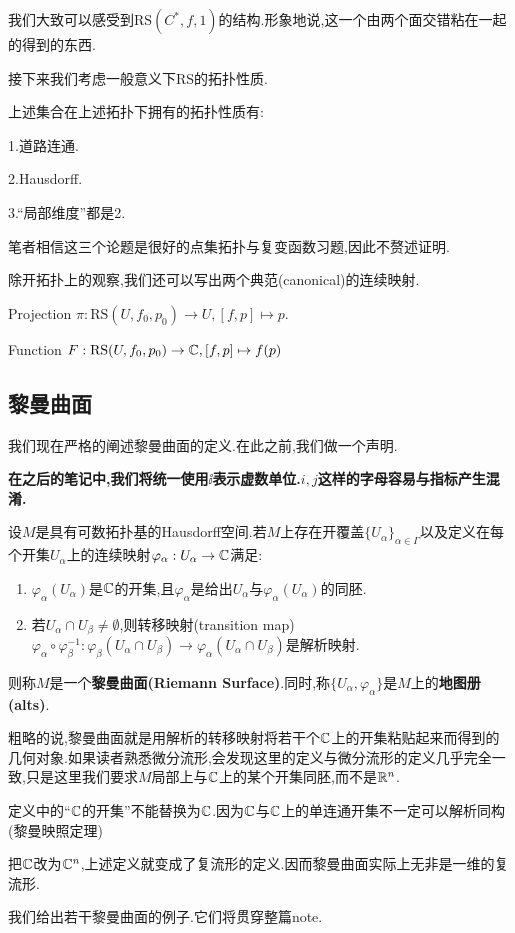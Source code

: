我们大致可以感受到$\text{RS}(C^*,f,1)$的结构.形象地说,这一个由两个面交错粘在一起的得到的东西.

接下来我们考虑一般意义下RS的拓扑性质.
\begin{proposition}
	上述集合在上述拓扑下拥有的拓扑性质有:
	
	1.道路连通.

	2.Hausdorff.

	3.“局部维度”都是2.
\end{proposition}
笔者相信这三个论题是很好的点集拓扑与复变函数习题,因此不赘述证明.

\begin{remark}
	除开拓扑上的观察,我们还可以写出两个典范(canonical)的连续映射.

	Projection \quad $\pi:\text{RS}(U,f_0,p_0) \to U,[f,p]\mapsto p$.

	Function \quad $F:\text{RS}(U,f_0,p_0) \to \mathbb{C},[f,p]\mapsto f(p)$
\end{remark}
\subsection{黎曼曲面}
我们现在严格的阐述黎曼曲面的定义.在此之前,我们做一个声明.

\textbf{在之后的笔记中,我们将统一使用$\ii$表示虚数单位.$i,j$这样的字母容易与指标产生混淆.}
\begin{definition}[黎曼曲面]
	设$M$是具有可数拓扑基的Hausdorff空间.若$M$上存在开覆盖$\{U_\alpha\}_{\alpha \in \Gamma}$以及定义在每个开集$U_\alpha$上的连续映射$\varphi_\alpha:U_\alpha \to \mathbb{C}$满足:
	\begin{enumerate}
		\item $\varphi_\alpha(U_\alpha)$是$\mathbb{C}$的开集,且$\varphi_\alpha$是给出$U_\alpha$与$\varphi_\alpha(U_\alpha)$的同胚.
		\item 若$U_\alpha \cap U_\beta \neq \emptyset$,则转移映射(transition map)$\varphi_\alpha \circ \varphi_{\beta}^{-1}:\varphi_\beta(U_\alpha \cap U_\beta) \to \varphi_\alpha(U_\alpha \cap U_\beta)$是解析映射.
	\end{enumerate}
	则称$M$是一个\textbf{黎曼曲面(Riemann Surface)}.同时,称$\{U_\alpha,\varphi_\alpha\}$是$M$上的\textbf{地图册(alts)}.
\end{definition}
粗略的说,黎曼曲面就是用解析的转移映射将若干个$\mathbb{C}$上的开集粘贴起来而得到的几何对象.如果读者熟悉微分流形,会发现这里的定义与微分流形的定义几乎完全一致,只是这里我们要求$M$局部上与$\mathbb{C}$上的某个开集同胚,而不是$\mathbb{R}^n$.
\begin{remark}
	定义中的“$\mathbb{C}$的开集”不能替换为$\mathbb{C}$.因为$\mathbb{C}$与$\mathbb{C}$上的单连通开集不一定可以解析同构(黎曼映照定理)
\end{remark}
\begin{remark}
	把$\mathbb{C}$改为$\mathbb{C}^n$,上述定义就变成了复流形的定义.因而黎曼曲面实际上无非是一维的复流形.
\end{remark}
我们给出若干黎曼曲面的例子.它们将贯穿整篇note.


